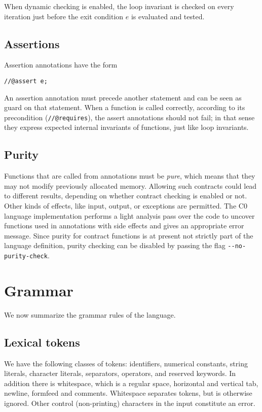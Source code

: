 \documentclass[11pt]{article}
\begin{document}
When dynamic checking is enabled, the loop invariant is checked on
every iteration just before the exit condition $e$ is evaluated and
tested.

\subsection{Assertions}

Assertion annotations have the form
\begin{verbatim}
//@assert e;
\end{verbatim}
An assertion annotation must precede another statement and can be seen
as guard on that statement.  When a function is called correctly,
according to its precondition (\verb'//@requires'), the assert
annotations should not fail; in that sense they express expected
internal invariants of functions, just like loop invariants.

\subsection{Purity}

Functions that are called from annotations must be \emph{pure}, which
means that they may not modify previously allocated memory.  Allowing
such contracts could lead to different results, depending on whether
contract checking is enabled or not.  Other kinds of effects, like
input, output, or exceptions are permitted.  The C0 language
implementation performs a light analysis pass over the code to uncover
functions used in annotations with side effects and gives an
appropriate error message.  Since purity for contract functions is at
present not strictly part of the language definition, purity checking
can be disabled by passing the flag \verb'--no-purity-check'.

\section{Grammar}

We now summarize the grammar rules of the language.

\subsection{Lexical tokens}

We have the following classes of tokens: identifiers, numerical
constants, string literals, character literals, separators, operators,
and reserved keywords.  In addition there is whitespace, which is
a regular space, horizontal and vertical tab, newline, formfeed
and comments.  Whitespace separates tokens, but is otherwise
ignored.  Other control (non-printing) characters in the input
constitute an error.
\end{document}

